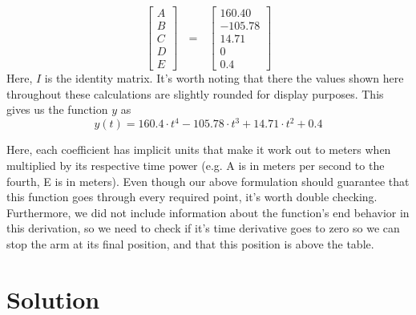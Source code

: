 \documentclass[nofoot,pdf-a,balance,colorlinks,upint,subscriptcorrection,varvw,mathalfa=cal=boondoxo]{asmeconf}
\begin{document}
    \begin{equation}
        \begin{bmatrix}
            A \\
            B \\ 
            C \\ 
            D \\ 
            E 
        \end{bmatrix}
        \textrm{ } = \textrm{ }  
        \begin{bmatrix}
            160.40 \\ 
            -105.78 \\ 
            14.71 \\ 
            0 \\ 
            0.4
        \end{bmatrix}
    \end{equation}
    Here, $I$ is the identity matrix. It's worth noting that there the values shown here throughout these calculations are slightly rounded for display purposes. This gives us the function $y$ as 
    \begin{equation}\label{height}
        y\left(t\right) = 160.4 \cdot t^4 - 105.78 \cdot t^3 + 14.71 \cdot t^2 + 0.4
    \end{equation}

    Here, each coefficient has implicit units that make it work out to meters when multiplied by its respective time power (e.g. A is in meters per second to the fourth, E is in meters). Even though our above formulation should guarantee that this function goes through every required point, it's worth double checking. Furthermore, we did not include information about the function's end behavior in this derivation, so we need to check if it's time derivative goes to zero so we can stop the arm at its final position, and that this position is above the table.



	 
	\section*{Solution}
	
\end{document}

